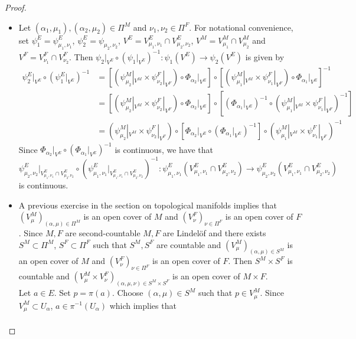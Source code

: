 \documentclass{book}
\theoremstyle{definition}
\newcommand{\al}{\alpha}
\DeclareMathOperator*{\0}{\mbf{0}}
\DeclareMathOperator*{\1}{\mbf{1}}
\begin{document}
\begin{proof}
\begin{itemize}
			\item Let $(\al_1, \mu_1), (\al_2, \mu_2) \in \Pi^M$ and $\nu_1, \nu_2 \in \Pi^F$. For notational convenience, set $\psi^E_1 = \psi^E_{\mu_1, \nu_1}$, $\psi^E_2 = \psi_{\mu_2, \nu_2}$, $V^E = V^E_{\mu_1, \nu_1} \cap V^E_{\mu_2, \nu_2}$, $V^M = V_{\mu_1}^M \cap V^M_{\mu_2}$ and $V^F = V^F_{\nu_1} \cap V^F_{\nu_2}$. Then $\psi_2|_{V^E} \circ (\psi_1|_{V^E})^{-1}: \psi_1(V^E) \rightarrow \psi_2(V^E)$ is given by
			\begin{align*}
				\psi^E_2|_{V^E} \circ (\psi^E_1|_{V^E})^{-1}
				& = [(\psi_{\mu_2}^M|_{V^M} \times \psi_{\nu_2}^F|_{V^F}) \circ \Phi_{\al_2}|_{V^E}] \circ [(\psi_{\mu_1}^M|_{V^M} \times \psi_{\nu_1}^F|_{V^F}) \circ \Phi_{\al_1}|_{V^E}]^{-1} \\
				& = [(\psi_{\mu_2}^M|_{V^M} \times \psi_{\nu_2}^F|_{V^F}) \circ \Phi_{\al_2}|_{V^E}] \circ [(\Phi_{\al_1}|_{V^E})^{-1} \circ (\psi_{\mu_1}^M|_{V^M} \times \psi_{\nu_1}^F|_{V^F})^{-1}] \\
				& = (\psi_{\mu_2}^M|_{V^M} \times \psi_{\nu_2}^F|_{V^F}) \circ [\Phi_{\al_2}|_{V^E} \circ (\Phi_{\al_1}|_{V^E})^{-1}] \circ (\psi_{\mu_1}^M|_{V^M} \times \psi_{\nu_1}^F|_{V^F})^{-1}
			\end{align*}
			Since $\Phi_{\al_2}|_{V^E} \circ (\Phi_{\al_1}|_{V^E})^{-1}$ is continuous, we have that 
			$$\psi^E_{\mu_2, \nu_2}|_{V^E_{\mu_1, \nu_1} \cap V^E_{\mu_2, \nu_2}} \circ (\psi^E_{\mu_1, \nu_1}|_{V^E_{\mu_1, \nu_1} \cap V^E_{\mu_2, \nu_2}})^{-1}: \psi^E_{\mu_1, \nu_1}(V^E_{\mu_1, \nu_1} \cap V^E_{\mu_2, \nu_2}) \rightarrow \psi^E_{\mu_2, \nu_2}(V^E_{\mu_1, \nu_1} \cap V^E_{\mu_2, \nu_2})$$ 
			is continuous.
			\item A previous exercise in the section on topological manifolds implies that $(V^M_{\mu})_{(\al, \mu) \in \Pi^M}$ is an open cover of $M$ and $(V^F_{\nu})_{\nu \in \Pi^F}$ is an open cover of $F$. Since $M,F$ are second-countable $M,F$ are Lindel\"{o}f and there exists $S^M \subset \Pi^M$, $S^F \subset \Pi^F$ such that $S^M, S^F$ are countable and $(V_{\mu}^M )_{(\al, \mu) \in S^M}$ is an open cover of $M$ and $(V^F_{\nu})_{\nu \in \Pi^F}$ is an open cover of $F$. Then $S^M \times S^F$ is countable and $(V_{\mu}^M \times V_{\nu}^F)_{(\al, \mu, \nu) \in S^M \times S^F}$ is an open cover of $M \times F$. \\
			Let $a \in E$. Set $p = \pi(a)$. Choose $(\al, \mu) \in S^M$ such that $p \in V_{\mu}^M$. Since $V^M_{\mu} \subset U_{\al}$, $a \in \pi^{-1}(U_{\al})$ which implies that
			\begin{align*}

\end{align*}
\end{itemize}
\end{proof}
\end{document}
